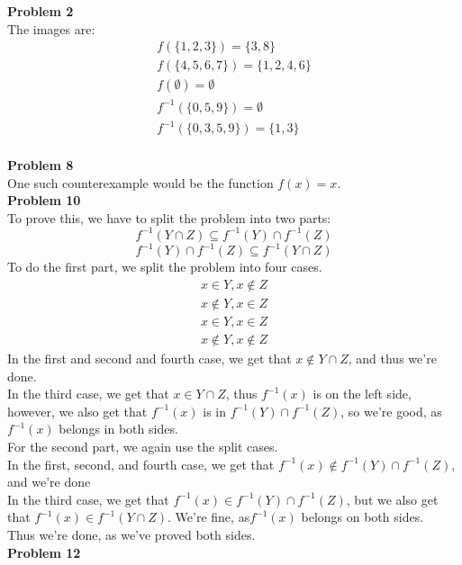 \documentclass[12pt]{article}
\begin{document}
\noindent
\textbf{Problem 2} \\

\noindent
The images are:
\begin{align*}
	f(\{1,2,3\}) = \{3,8\} \\
	f(\{4,5,6,7\}) = \{1,2,4,6\} \\
	f(\emptyset) = \emptyset \\
	f^{-1}(\{0,5,9\}) = \emptyset \\
	f^{-1}(\{0,3,5,9\}) = \{1,3\} 
\end{align*}\\

\noindent
\textbf{Problem 8}\\

\noindent
One such counterexample would be the function $f(x) = x$.\\
 
\noindent
\textbf{Problem 10}\\

\noindent
To prove this, we have to split the problem into two parts:
$$f^{-1}(Y \cap Z) \subseteq f^{-1}(Y)\cap f^{-1}(Z)$$
$$f^{-1}(Y)\cap f^{-1}(Z) \subseteq f^{-1}(Y \cap Z)$$
To do the first part, we split the problem into four cases. 
\begin{align}
	x \in Y, x \notin Z\\
	x \notin Y, x \in Z\\
	x \in Y, x \in Z\\
	x \notin Y, x \notin Z
\end{align}
In the first and second and fourth case, we get that $x \notin Y \cap Z$, and thus we're done.\\
In the third case, we get that $x \in Y \cap Z$, thus $f^{-1}(x)$ is on the left side,
however, we also get that $f^{-1}(x)$ is in $f^{-1}(Y) \cap f^{-1}(Z)$, so we're good, 
as $f^{-1}(x)$ belongs in both sides. \\
For the second part, we again use the split cases. \\
In the first, second, and fourth case, we get that $f^{-1}(x) \not\in f^{-1}(Y) \cap f^{-1}(Z)$, 
and we're done\\
In the third case, we get that $f^{-1}(x) \in f^{-1}(Y) \cap f^{-1}(Z)$, but we also get that 
$f^{-1}(x) \in f^{-1}(Y \cap Z)$. We're fine, as$f^{-1}(x)$ belongs on both sides. \\
Thus we're done, as we've proved both sides. \\

\noindent
\textbf{Problem 12}\\
\end{document}
